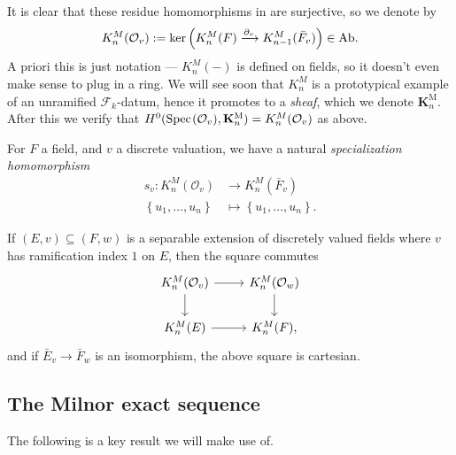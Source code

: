 \documentclass[11pt,openany]{book}
\let\del\partial
\providecommand{\KM}{\mathbf{K}^\mathrm{M}}
\begin{document}
\begin{notation} It is clear that these residue homomorphisms in  are surjective, so we denote by
\begin{equation}\label{eqn:Milnor-K-thy-of-unit-ring}
\begin{aligned}
    K_n^M(\mathcal{O}_v) := \ker \left( K_n^M(F) \xto{\del_v} K_{n-1}^M(\bar{F}_v) \right) \in \Ab.
\end{aligned}
\end{equation}
A priori this is just notation --- $K_n^M(-)$ is defined on fields, so it doesn't even make sense to plug in a ring. We will see soon that $K_n^M$ is a prototypical example of an unramified $\mathcal{F}_k$-datum, hence it promotes to a \emph{sheaf}, which we denote $\KM_n$. After this we verify that $H^0(\Spec(\mathcal{O}_v),\KM_n) = K_n^M(\mathcal{O}_v)$ as above.%
\end{notation}

\begin{definition}\label{def:specialization-Milnor-K-theory} 
For $F$ a field, and $v$ a discrete valuation, we have a natural \emph{specialization homomorphism}
\begin{align*}
    s_v \colon K_n^M(\mathcal{O}_v) &\to K_n^M(\bar{F}_v) \\
    \left\{ u_1, \ldots, u_n \right\}&\mapsto \left\{ u_1, \ldots, u_n \right\}.
\end{align*}
\end{definition}

\begin{proposition}\label{prop:A1-axiom-Milnor-K-thy} 
If $(E,v) \subseteq (F,w)$ is a separable extension of discretely valued fields where $v$ has ramification index $1$ on $E$, then the square commutes
\[ \begin{tikzcd}
    K_n^M(\mathcal{O}_v)\dar\rar & K_n^M(\mathcal{O}_w)\dar\\
    K_n^M(E)\rar & K_n^M(F),
\end{tikzcd} \]
and if $\bar{E}_v \to \bar{F}_w$ is an isomorphism, the above square is cartesian.
\end{proposition}




\subsection{The Milnor exact sequence}

The following is a key result we will make use of.
\end{document}
